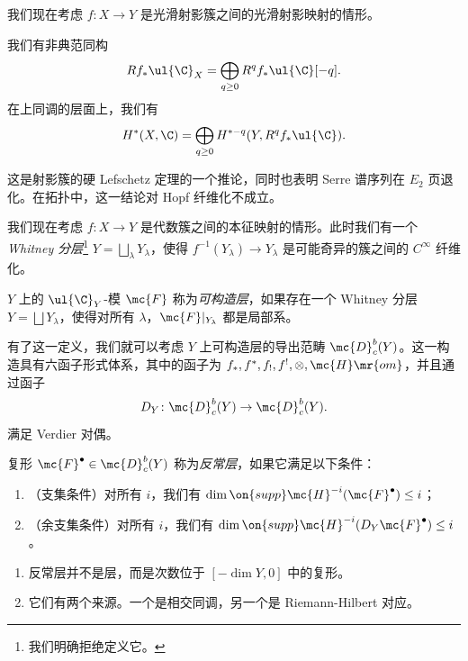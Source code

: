 我们现在考虑 \(f \colon X \to Y\) 是光滑射影簇之间的光滑射影映射的情形。

\begin{thm}
    我们有非典范同构
    \[ R f_* \ul{\C}_X = \bigoplus_{q \geq 0} R^q f_* \ul{\C}[-q]. \]
    在上同调的层面上，我们有
    \[ H^*(X, \C) = \bigoplus_{q \geq 0} H^{*-q}(Y, R^q f_* \ul{\C}). \]
\end{thm}

这是射影簇的硬 Lefschetz 定理的一个推论，同时也表明 Serre 谱序列在 \(E_2\) 页退化。在拓扑中，这一结论对 Hopf 纤维化不成立。

我们现在考虑 \(f \colon X \to Y\) 是代数簇之间的本征映射的情形。此时我们有一个 \textit{Whitney 分层}\footnote{我们明确拒绝定义它。} \(Y = \bigsqcup_{\lambda} Y_{\lambda}\)，使得 \(f^{-1}(Y_{\lambda}) \to Y_{\lambda}\) 是可能奇异的簇之间的 \(C^{\infty}\) 纤维化。

\begin{defn}
    \(Y\) 上的 \(\ul{\C}_Y\)-模 \(\mc{F}\) 称为\textit{可构造层}，如果存在一个 Whitney 分层 \(Y = \bigsqcup Y_{\lambda}\)，使得对所有 \(\lambda\)，\(\mc{F}|_{Y_{\lambda}}\) 都是局部系。
\end{defn}

有了这一定义，我们就可以考虑 \(Y\) 上可构造层的导出范畴 \(\mc{D}_c^b(Y)\)。这一构造具有六函子形式体系，其中的函子为 \(f_*, f^*, f_!, f^!, \otimes, \mc{H}\mr{om}\)，并且通过函子
\[ D_Y \colon \mc{D}_c^b(Y) \to \mc{D}_c^b(Y). \]
满足 Verdier 对偶。

\begin{defn}
    复形 \(\mc{F}^{\bullet} \in \mc{D}_c^b(Y)\) 称为\textit{反常层}，如果它满足以下条件：
    \begin{enumerate}
        \item （支集条件）对所有 \(i\)，我们有 \(\dim \on{supp} \mc{H}^{-i}(\mc{F}^{\bullet}) \leq i\)；
        \item （余支集条件）对所有 \(i\)，我们有 \(\dim \on{supp} \mc{H}^{-i}(D_Y \mc{F}^{\bullet}) \leq i\)。
    \end{enumerate}
\end{defn}

\begin{rmks}\leavevmode
    \begin{enumerate}
        \item 反常层并不是层，而是次数位于 \([-\dim Y, 0]\) 中的复形。
        \item 它们有两个来源。一个是相交同调，另一个是 Riemann-Hilbert 对应。
    \end{enumerate}
\end{rmks}

